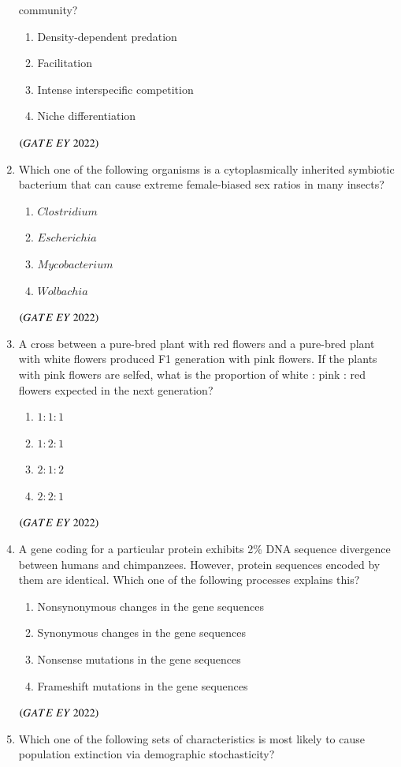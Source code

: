 \documentclass[journal]{IEEEtran}
\numberwithin{equation}{enumi}
\numberwithin{figure}{enumi}
\begin{document}
\begin{enumerate}
community?
    \begin{enumerate}
        \item  Density-dependent predation
        \item  Facilitation
        \item  Intense interspecific competition
        \item  Niche differentiation
    \end{enumerate}
    \hfill{$\brak{ GATE\ EY\ 2022}$}
    \bigskip
 \item Which one of the following organisms is a cytoplasmically inherited symbiotic
bacterium that can cause extreme female-biased sex ratios in many insects?
    \begin{enumerate}
        \item  $Clostridium$
        \item  $Escherichia$
        \item  $Mycobacterium$
        \item  $Wolbachia$
    \end{enumerate}
    \hfill{$\brak{ GATE\ EY\ 2022}$}
    \bigskip
 \item A cross between a pure-bred plant with red flowers and a pure-bred plant with
white flowers produced F1 generation with pink flowers. If the plants with pink
flowers are selfed, what is the proportion of white : pink : red flowers expected in
the next generation?
    \begin{enumerate}
        \item  $1 : 1 : 1$
        \item  $1 : 2 : 1$
        \item  $2 : 1 : 2$
        \item  $2 : 2 : 1$
    \end{enumerate}
    \hfill{$\brak{ GATE\ EY\ 2022}$}
    \bigskip
 \item A gene coding for a particular protein exhibits 2\% DNA sequence divergence
between humans and chimpanzees. However, protein sequences encoded by them
are identical. Which one of the following processes explains this?
    \begin{enumerate}
        \item  Nonsynonymous changes in the gene sequences
        \item  Synonymous changes in the gene sequences
        \item  Nonsense mutations in the gene sequences
        \item  Frameshift mutations in the gene sequences
    \end{enumerate}
    \hfill{$\brak{ GATE\ EY\ 2022}$}
    \bigskip
 \item Which one of the following sets of characteristics is most likely to cause
population extinction via demographic stochasticity?


\end{enumerate}
\end{document}

